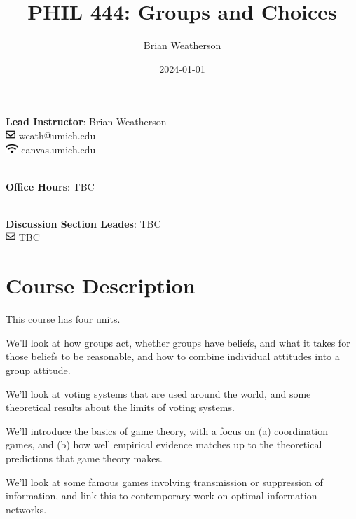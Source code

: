 \documentclass[
  12pt,
  letterpaper,
  DIV=11,
  numbers=noendperiod]{scrartcl}
\title{PHIL 444: Groups and Choices}
\author{Brian Weatherson}
\date{2024-01-01}
\providecommand{\tightlist}{%
  \setlength{\itemsep}{0pt}\setlength{\parskip}{0pt}}\usepackage{longtable,booktabs,array}
\begin{document}
\maketitle

\textbf{Lead Instructor}: Brian Weatherson\\
\includegraphics[width=1em,height=1em]{syllabus-phil444-w24_files/figure-pdf/fa-icon-a7ff419e70980f9f1a65816048d94526.pdf}
weath@umich.edu\\
\includegraphics[width=1.25em,height=1em]{syllabus-phil444-w24_files/figure-pdf/fa-icon-69b5e588a8cebb8cb21405167a7066e5.pdf}
canvas.umich.edu\\
\strut \\
\textbf{Office Hours}: TBC\\
\strut \\
\textbf{Discussion Section Leades}: TBC\\
\includegraphics[width=1em,height=1em]{syllabus-phil444-w24_files/figure-pdf/fa-icon-a7ff419e70980f9f1a65816048d94526.pdf}
TBC

\section{Course Description}\label{course-description}

This course has four units.

\begin{description}
\tightlist
\item[Group Attitudes]
We'll look at how groups act, whether groups have beliefs, and what it
takes for those beliefs to be reasonable, and how to combine individual
attitudes into a group attitude.
\item[Voting]
We'll look at voting systems that are used around the world, and some
theoretical results about the limits of voting systems.
\item[Games and Coordination]
We'll introduce the basics of game theory, with a focus on (a)
coordination games, and (b) how well empirical evidence matches up to
the theoretical predictions that game theory makes.
\item[Information Networks]
We'll look at some famous games involving transmission or suppression of
information, and link this to contemporary work on optimal information
networks.
\end{description}
\end{document}
